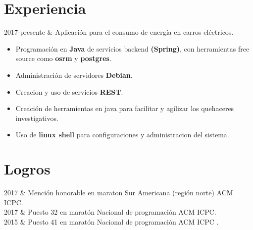 \documentclass[
    changecolor={111, 156, 45}, 
]{cv-roald}
\begin{document}
\section*{Experiencia}
\begin{tabularcv}
2017-presente   &   
                \newline Aplicación para el consumo de energía en carros eléctricos.
                \begin{itemize}
                  \item Programación en \textbf{Java} de servicios backend \textbf{(Spring)}, con herramientas free source como \textbf{osrm} y \textbf{postgres}.
                  \item Administración de servidores \textbf{Debian}.
                  \item Creacion y uso de servicios \textbf{REST}.
                  \item Creación de herramientas en java para facilitar y agilizar los quehaceres investigativos.
				  \item Uso de \textbf{linux shell} para configuraciones y administracion del sistema. 
                \end{itemize} 

                
\end{tabularcv}   

\section*{Logros}
\begin{tabularcv}	
2017    &   Mención honorable en maraton Sur Americana (región norte) ACM ICPC. \\
2017	&	Puesto 32 en maratón Nacional de programación ACM ICPC.  \\
2015    &   Puesto 41 en maratón Nacional de programación ACM ICPC  .  \\

                
\end{tabularcv}
\end{document}
